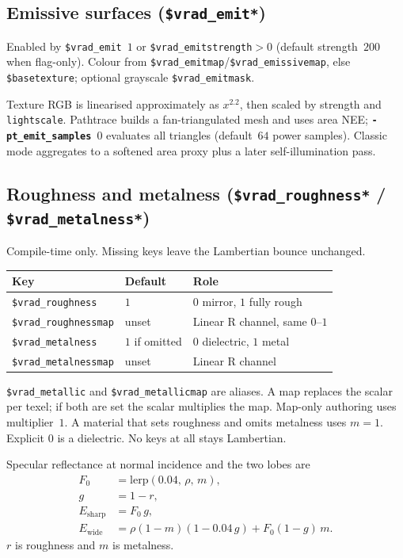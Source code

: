 \documentclass[11pt,a4paper]{article}
\newcommand{\flag}[1]{\texttt{\bfseries #1}}
\newcommand{\vmt}[1]{\texttt{\$#1}}
\newcommand{\code}[1]{\texttt{#1}}
\begin{document}
\subsection{Emissive surfaces (\vmt{vrad\_emit*})}

Enabled by \vmt{vrad\_emit}~$1$ or \vmt{vrad\_emitstrength}${}>0$
(default strength~$200$ when flag-only). Colour from
\vmt{vrad\_emitmap}/\vmt{vrad\_emissivemap}, else \vmt{basetexture}; optional
grayscale \vmt{vrad\_emitmask}.

Texture RGB is linearised approximately as $x^{2.2}$, then scaled by strength
and \code{lightscale}. Pathtrace builds a fan-triangulated mesh and uses area
NEE; \flag{-pt\_emit\_samples}~$0$ evaluates all triangles (default~$64$
power samples). Classic mode aggregates to a softened area proxy plus a later
self-illumination pass.

\subsection{Roughness and metalness (\vmt{vrad\_roughness*} / \vmt{vrad\_metalness*})}
\label{sec:brdf}

Compile-time only. Missing keys leave the Lambertian bounce unchanged.

\begin{center}
\small
\begin{tabular}{@{}lll@{}}
  \toprule
  Key & Default & Role \\
  \midrule
  \vmt{vrad\_roughness} & $1$ & $0$ mirror, $1$ fully rough \\
  \vmt{vrad\_roughnessmap} & unset & Linear R channel, same $0$--$1$ \\
  \vmt{vrad\_metalness} & $1$ if omitted & $0$ dielectric, $1$ metal \\
  \vmt{vrad\_metalnessmap} & unset & Linear R channel \\
  \bottomrule
\end{tabular}
\end{center}

\vmt{vrad\_metallic} and \vmt{vrad\_metallicmap} are aliases. A map replaces the
scalar per texel; if both are set the scalar multiplies the map. Map-only
authoring uses multiplier~$1$. A material that sets roughness and omits
metalness uses $m=1$. Explicit $0$ is a dielectric. No keys at all stays
Lambertian.

Specular reflectance at normal incidence and the two lobes are
\begin{align*}
  F_0 &= \mathrm{lerp}(0.04,\,\rho,\,m), \\
  g &= 1-r, \\
  E_{\mathrm{sharp}} &= F_0\, g, \\
  E_{\mathrm{wide}} &= \rho(1-m)(1-0.04\,g) + F_0(1-g)\,m.
\end{align*}
$r$ is roughness and $m$ is metalness.
\end{document}
